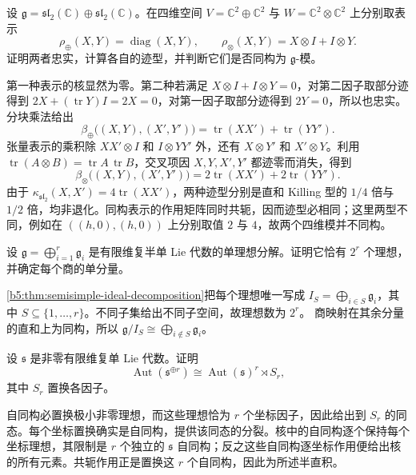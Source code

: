 \begin{exercise}\label{b5:ex:13-trace-nonfaithful}
	设 \(\mathfrak g=\mathfrak{sl}_2(\mathbb C)\oplus\mathfrak{sl}_2(\mathbb C)\)。在四维空间 \(V=\mathbb C^2\oplus\mathbb C^2\) 与 \(W=\mathbb C^2\otimes\mathbb C^2\) 上分别取表示
	\[
		\rho_{\oplus}(X,Y)=\operatorname{diag}(X,Y),\qquad \rho_{\otimes}(X,Y)=X\otimes I+I\otimes Y.
	\]
	证明两者忠实，计算各自的迹型，并判断它们是否同构为 \(\mathfrak g\)-模。
\end{exercise}
\begin{solution}
	第一种表示的核显然为零。第二种若满足 \(X\otimes I+I\otimes Y=0\)，对第二因子取部分迹得到 \(2X+(\operatorname{tr}Y)I=2X=0\)，对第一因子取部分迹得到 \(2Y=0\)，所以也忠实。 分块乘法给出
	\[
		\beta_{\oplus}\bigl((X,Y),(X',Y')\bigr) =\operatorname{tr}(XX')+\operatorname{tr}(YY').
	\]
	张量表示的乘积除 \(XX'\otimes I\) 和 \(I\otimes YY'\) 外，还有 \(X\otimes Y'\) 和 \(X'\otimes Y\)。利用 \(\operatorname{tr}(A\otimes B)=\operatorname{tr}A\,\operatorname{tr}B\)，交叉项因 \(X,Y,X',Y'\) 都迹零而消失，得到
	\[
		\beta_{\otimes}\bigl((X,Y),(X',Y')\bigr) =2\operatorname{tr}(XX')+2\operatorname{tr}(YY').
	\]
	由于 \(\kappa_{\mathfrak{sl}_2}(X,X')=4\operatorname{tr}(XX')\)，两种迹型分别是直和 Killing 型的 \(1/4\) 倍与 \(1/2\) 倍，均非退化。同构表示的作用矩阵同时共轭，因而迹型必相同；这里两型不同，例如在 \(((h,0),(h,0))\) 上分别取值 \(2\) 与 \(4\)，故两个四维模并不同构。
\end{solution}

\begin{exercise}\label{b5:ex:13-count-ideals}
	设 \(\mathfrak g=\bigoplus_{i=1}^r\mathfrak g_i\) 是有限维复半单 Lie 代数的单理想分解。证明它恰有 \(2^r\) 个理想，并确定每个商的单分量。
\end{exercise}
\begin{solution}
	\cref{b5:thm:semisimple-ideal-decomposition}把每个理想唯一写成 \(I_S=\bigoplus_{i\in S}\mathfrak g_i\)，其中 \(S\subseteq\{1,\ldots,r\}\)。不同子集给出不同子空间，故理想数为 \(2^r\)。 商映射在其余分量的直和上为同构，所以 \(\mathfrak g/I_S\cong\bigoplus_{i\notin S}\mathfrak g_i\)。
\end{solution}

\begin{exercise}\label{b5:ex:13-automorphisms-components}
	设 \(\mathfrak s\) 是非零有限维复单 Lie 代数。证明
	\[
		\operatorname{Aut}(\mathfrak s^{\oplus r}) \cong\operatorname{Aut}(\mathfrak s)^r\rtimes S_r,
	\]
	其中 \(S_r\) 置换各因子。
\end{exercise}
\begin{solution}
	自同构必置换极小非零理想，而这些理想恰为 \(r\) 个坐标因子，因此给出到 \(S_r\) 的同态。每个坐标置换确实是自同构，提供该同态的分裂。核中的自同构逐个保持每个坐标理想，其限制是 \(r\) 个独立的 \(\mathfrak s\) 自同构；反之这些自同构逐坐标作用便给出核的所有元素。共轭作用正是置换这 \(r\) 个自同构，因此为所述半直积。
\end{solution}

